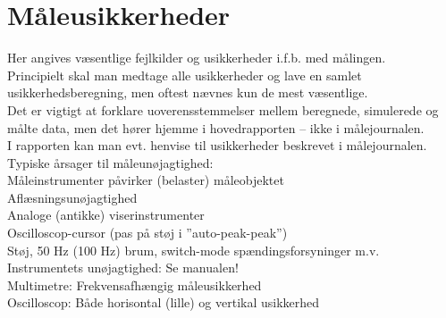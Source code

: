 \section{Måleusikkerheder}
\label{mic_output_maaleusikkerheder}
Her angives væsentlige fejlkilder og usikkerheder i.f.b. med målingen. \\
Principielt skal man medtage alle usikkerheder og lave en samlet usikkerhedsberegning, men oftest nævnes kun de mest væsentlige. \\
Det er vigtigt at forklare uoverensstemmelser mellem beregnede, simulerede og målte data, men det hører hjemme i hovedrapporten – ikke i målejournalen. \\
I rapporten kan man evt. henvise til usikkerheder beskrevet i målejournalen.\\
Typiske årsager til måleunøjagtighed:\\
Måleinstrumenter påvirker (belaster) måleobjektet\\
Aflæsningsunøjagtighed\\
Analoge (antikke) viserinstrumenter	\\
Oscilloscop-cursor (pas på støj i ”auto-peak-peak”)\\
Støj, 50 Hz (100 Hz) brum, switch-mode spændingsforsyninger m.v.\\
Instrumentets unøjagtighed: Se manualen! \\
Multimetre: Frekvensafhængig måleusikkerhed \\
Oscilloscop: Både horisontal (lille) og vertikal usikkerhed\\

